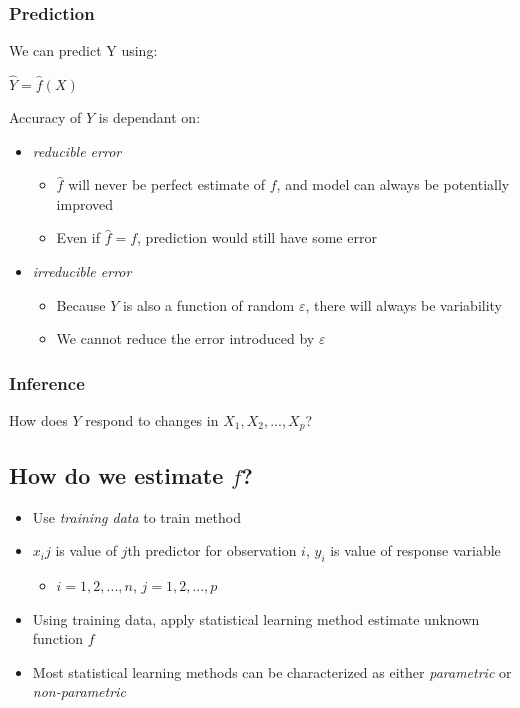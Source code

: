 \documentclass[]{book}
\providecommand{\tightlist}{%
  \setlength{\itemsep}{0pt}\setlength{\parskip}{0pt}}
\theoremstyle{definition}
\theoremstyle{definition}
\theoremstyle{definition}
\theoremstyle{remark}
\begin{document}
\subsubsection{Prediction}\label{prediction}

We can predict Y using:

\(\hat{Y} = \hat{f}(X)\)

Accuracy of \(Y\) is dependant on:

\begin{itemize}
\tightlist
\item
  \emph{reducible error}

  \begin{itemize}
  \tightlist
  \item
    \(\hat{f}\) will never be perfect estimate of \(f\), and model can
    always be potentially improved
  \item
    Even if \(\hat{f} = f\), prediction would still have some error
  \end{itemize}
\item
  \emph{irreducible error}

  \begin{itemize}
  \tightlist
  \item
    Because \(Y\) is also a function of random \(ε\), there will always
    be variability
  \item
    We cannot reduce the error introduced by \(ε\)
  \end{itemize}
\end{itemize}

\subsubsection{Inference}\label{inference}

How does \(Y\) respond to changes in \(X_1, X_2, ..., X_p\)?

\subsection{\texorpdfstring{How do we estimate
\emph{\(f\)}?}{How do we estimate f?}}\label{how-do-we-estimate-f}

\begin{itemize}
\tightlist
\item
  Use \emph{training data} to train method
\item
  \(x_ij\) is value of \(j\)th predictor for observation \(i\), \(y_i\)
  is value of response variable

  \begin{itemize}
  \tightlist
  \item
    \(i = 1, 2, ..., n\), \(j = 1, 2, ..., p\)
  \end{itemize}
\item
  Using training data, apply statistical learning method estimate
  unknown function \(f\)
\item
  Most statistical learning methods can be characterized as either
  \emph{parametric} or \emph{non-parametric}
\end{itemize}
\end{document}
